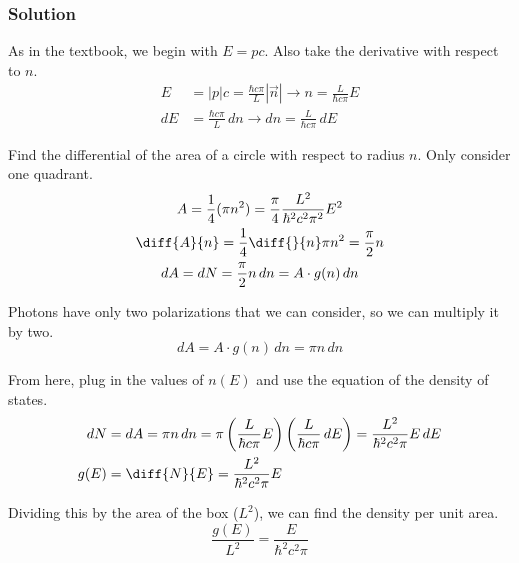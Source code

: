 \documentclass[12pt]{article}
\begin{document}
        \subsubsection{Solution}
            As in the textbook, we begin with $E = pc$.
            Also take the derivative with respect to $n$.
            \begin{align}
                E   &=  |p|c
                    =   \frac{\hbar c \pi}{L} \left| \vec{n} \right| \to n = \frac{L}{\hbar c \pi} E\\
                dE  &=  \frac{\hbar c \pi}{L}\,dn \to dn = \frac{L}{\hbar c \pi}\,dE
            \end{align}

            Find the differential of the area of a circle with respect to radius $n$.
            Only consider one quadrant.
            \begin{gather}
                A = \frac{1}{4}(\pi n^2) = \frac{\pi}{4} \frac{L^2}{\hbar^2 c^2 \pi^2} E^2\\
                \diff{A}{n} = \frac{1}{4} \diff{}{n} \pi n^2 = \frac{\pi}{2} n\\
                dA = dN = \frac{\pi}{2} n\,dn = A \cdot g(n)\,dn
            \end{gather}

            Photons have only two polarizations that we can consider, so we can multiply it by two.
            \begin{equation}
                dA = A \cdot g(n)\,dn = \pi n\,dn
            \end{equation}

            From here, plug in the values of $n(E)$ and use the equation of the density of states.
            \begin{align}
                dN  &=  dA
                    =   \pi n\,dn
                    =   \pi \left( \frac{L}{\hbar c \pi} E \right) \left( \frac{L}{\hbar c \pi}\,dE \right)
                    =   \frac{L^2}{\hbar^2 c^2 \pi} E\,dE\\
                g(E)    &=  \diff{N}{E}
                    =   \frac{L^2}{\hbar^2 c^2 \pi} E
            \end{align}

            Dividing this by the area of the box ($L^2$), we can find the density per unit area.
            \begin{equation}
                \frac{g(E)}{L^2} = \boxed{\frac{E}{\hbar^2 c^2 \pi}}
            \end{equation}
        
\end{document}

